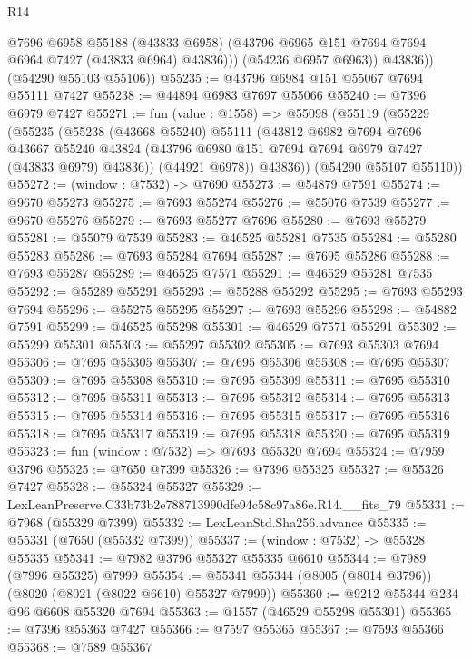 \begin{lexlean}{R14}
\begin{coremodule}
                @7696
                @6958
                @55188
                (@43833 @6958)
                (@43796 @6965 @151 @7694 @7694 @6964 @7427 (@43833 @6964) @43836)))
            (@54236 @6957 @6963))
          @43836))
      (@54290 @55103 @55106))
@55235 := @43796 @6984 @151 @55067 @7694 @55111 @7427
@55238 := @44894 @6983 @7697 @55066
@55240 := @7396 @6979 @7427
@55271 := fun (value : @1558) =>
  @55098
    (@55119
      (@55229
        (@55235
          (@55238
            (@43668 @55240)
            @55111
            (@43812
              @6982
              @7694
              @7696
              @43667
              @55240
              @43824
              (@43796 @6980 @151 @7694 @7694 @6979 @7427 (@43833 @6979) @43836))
            (@44921 @6978))
          @43836))
      (@54290 @55107 @55110))
@55272 := (window : @7532) -> @7690
@55273 := @54879 @7591
@55274 := @9670 @55273
@55275 := @7693 @55274
@55276 := @55076 @7539
@55277 := @9670 @55276
@55279 := @7693 @55277 @7696
@55280 := @7693 @55279
@55281 := @55079 @7539
@55283 := @46525 @55281 @7535
@55284 := @55280 @55283
@55286 := @7693 @55284 @7694
@55287 := @7695 @55286
@55288 := @7693 @55287
@55289 := @46525 @7571
@55291 := @46529 @55281 @7535
@55292 := @55289 @55291
@55293 := @55288 @55292
@55295 := @7693 @55293 @7694
@55296 := @55275 @55295
@55297 := @7693 @55296
@55298 := @54882 @7591
@55299 := @46525 @55298
@55301 := @46529 @7571 @55291
@55302 := @55299 @55301
@55303 := @55297 @55302
@55305 := @7693 @55303 @7694
@55306 := @7695 @55305
@55307 := @7695 @55306
@55308 := @7695 @55307
@55309 := @7695 @55308
@55310 := @7695 @55309
@55311 := @7695 @55310
@55312 := @7695 @55311
@55313 := @7695 @55312
@55314 := @7695 @55313
@55315 := @7695 @55314
@55316 := @7695 @55315
@55317 := @7695 @55316
@55318 := @7695 @55317
@55319 := @7695 @55318
@55320 := @7695 @55319
@55323 := fun (window : @7532) => @7693 @55320 @7694
@55324 := @7959 @3796
@55325 := @7650 @7399
@55326 := @7396 @55325
@55327 := @55326 @7427
@55328 := @55324 @55327
@55329 := LexLeanPreserve.C33b73b2e788713990dfe94c58c97a86e.R14.__fits_79
@55331 := @7968 (@55329 @7399)
@55332 := LexLeanStd.Sha256.advance
@55335 := @55331 (@7650 (@55332 @7399))
@55337 := (window : @7532) -> @55328 @55335
@55341 := @7982 @3796 @55327 @55335 @6610
@55344 := @7989 (@7996 @55325) @7999
@55354 := @55341 @55344 (@8005 (@8014 @3796)) (@8020 (@8021 (@8022 @6610) @55327 @7999))
@55360 := @9212 @55344 @234 @96 @6608 @55320 @7694
@55363 := @1557 (@46529 @55298 @55301)
@55365 := @7396 @55363 @7427
@55366 := @7597 @55365
@55367 := @7593 @55366
@55368 := @7589 @55367

\end{coremodule}
\end{lexlean}
